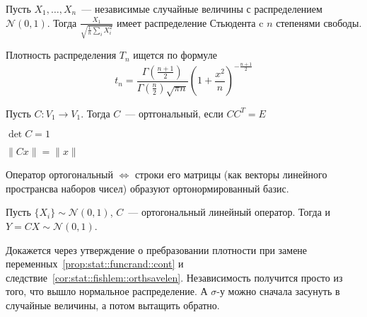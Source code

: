 \documentclass[12pt,timbord]{../../../notes}
\begin{document}
\begin{defn}\label{defn:stat::fishlem::student}
  Пусть $X_1, \dotsc, X_n$~--- независимые случайные величины с распределением $\mathcal N(0,1)$.
  Тогда $\displaystyle \frac{X_1}{\sqrt{\frac{1}{n} \sum_i X_i^2}}$ имеет распределение Стьюдента 
  c $n$ степенями свободы. 
\end{defn}
\begin{prop}\label{prop:stat::fishlem::studens}
  Плотность распределения $T_n$ ищется по формуле 
  \[\displaystyle t_n = \dfrac{\Gamma(\frac{n+1}{2})}{\Gamma(\frac{n}{2}) \sqrt{\pi n}} 
  \left(1+\dfrac {x^2} n\right)^{-\frac{n+1}{2} } \]
\end{prop}


\begin{defn}\label{defn:stat::fishlem::orth}
  Пусть $C\colon V_1 \to V_1$. Тогда $C$~--- ортгональный, если $C C^T = E$
\end{defn}
\begin{cor}\label{cor:stat::fishlem::orth1}
  $\det C = 1$
\end{cor}
\begin{cor}\label{cor:stat::fishlem::orthsavelen}
  $\|Cx\| = \|x\|$
\end{cor}

\begin{prop}\label{prop:stat::fishlem::orthmtx}
  Оператор ортогональный $ \Leftrightarrow $ строки его матрицы 
  (как векторы линейного пространсва наборов чисел) образуют ортонормированный базис.
\end{prop}

\begin{prop}\label{prop:stat::fishlem::orthnorm}
  Пусть $\{X_i\} \sim \mathcal N(0,1)$, $C$~--- ортогональный линейный оператор. 
  Тогда и $Y = CX \sim \mathcal N (0,1)$.
\end{prop}
\begin{itlproof}
  Докажется через утверждение о пребразовании плотности при замене 
  переменных~\ref{prop:stat::funcrand::cont} 
  и следствие~\ref{cor:stat::fishlem::orthsavelen}. Независимость получится просто из того, что
  вышло нормальное распределение. А $\sigma$-у можно сначала засунуть в случайные величины, а
  потом вытащить обратно.
\end{itlproof}
\end{document}

